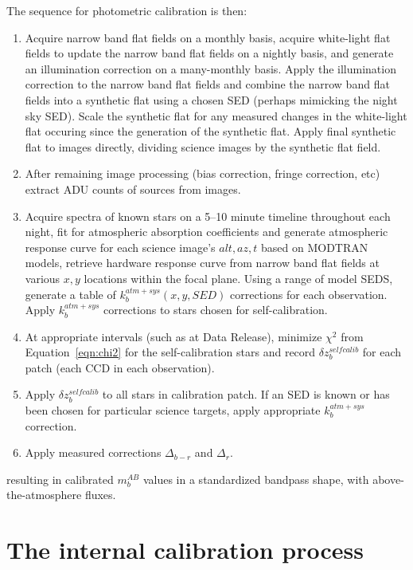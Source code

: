 \documentclass[12pt,preprint]{aastex}
\begin{document}
The sequence for photometric calibration is then:
\begin{enumerate}
\item{Acquire narrow band flat fields on a monthly basis, acquire
white-light flat fields to update the narrow band flat fields on a
nightly basis, and generate an illumination correction on a
many-monthly basis. Apply the illumination correction to the narrow
band flat fields and combine the narrow band flat fields into a
synthetic flat using a chosen SED (perhaps mimicking the night sky
SED). Scale the synthetic flat for any measured changes in the
white-light flat occuring since the generation of the synthetic
flat. Apply final synthetic flat to images directly, dividing science 
images by the synthetic flat field.}
\item{After remaining image processing (bias correction, fringe correction, etc)
extract ADU counts of sources from images. }
\item{Acquire spectra of known stars on a 5--10 minute timeline
throughout each night, fit for atmospheric absorption coefficients 
and generate atmospheric response curve for each science image's
$alt,az,t$ based on MODTRAN models, retrieve hardware
response curve from narrow band flat fields at various $x,y$ locations
within the focal plane. Using a range of model SEDS, generate a table
of $k_b^{atm+sys}(x,y,SED)$ corrections for each observation. Apply
$k_b^{atm+sys}$ corrections to stars chosen for self-calibration.}
\item{At appropriate intervals (such as at Data Release), minimize
$\chi^2$ from Equation~\ref{eqn:chi2} for the self-calibration stars
and record $\delta z_b^{selfcalib}$ for each patch (each CCD in each
observation).}
\item{Apply $\delta z_b^{selfcalib}$ to all stars in calibration
patch. If an SED is known or has been chosen for particular science
targets, apply appropriate $k_b^{atm+sys}$ correction.}
\item{Apply measured corrections $\Delta_{b-r}$ and $\Delta_r$.}
\end{enumerate}
resulting in calibrated $m_b^{AB}$ values in a standardized bandpass shape, 
with above-the-atmosphere fluxes. 

\section{The internal calibration process}
\label{sec:calib_details}
\end{document}
